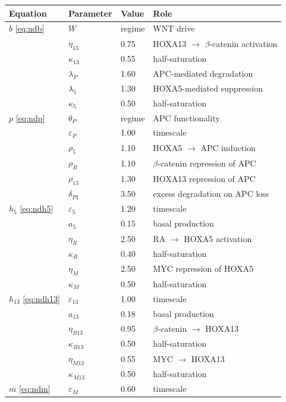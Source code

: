 \documentclass[11pt]{article}
\newcommand{\bcat}{$\beta$-\hspace{0pt}catenin}
\newcommand{\thP}{\theta_P}
\begin{document}
\begin{table}[H]
\centering
\small
\begin{tabular}{llll}
\toprule
\textbf{Equation} & \textbf{Parameter} & \textbf{Value} & \textbf{Role} \\
\midrule
$b$ \eqref{eq:ndb}
  & $W$          & regime & WNT drive \\
  & $\eta_{13}$  & 0.75 & HOXA13 $\to$ \bcat{} activation \\
  & $\kappa_{13}$& 0.55 & half-saturation \\
  & $\lambda_P$  & 1.60 & APC-mediated degradation \\
  & $\lambda_5$  & 1.30 & HOXA5-mediated suppression \\
  & $\kappa_5$   & 0.50 & half-saturation \\
\midrule
$p$ \eqref{eq:ndp}
  & $\thP$       & regime & APC functionality \\
  & $\varepsilon_P$ & 1.00 & timescale \\
  & $\rho_5$     & 1.10 & HOXA5 $\to$ APC induction \\
  & $\rho_B$     & 1.10 & \bcat{} repression of APC \\
  & $\rho_{13}$  & 1.30 & HOXA13 repression of APC \\
  & $\delta_{P1}$& 3.50 & excess degradation on APC loss \\
\midrule
$h_5$ \eqref{eq:ndh5}
  & $\varepsilon_5$ & 1.20 & timescale \\
  & $a_5$        & 0.15 & basal production \\
  & $\eta_R$     & 2.50 & RA $\to$ HOXA5 activation \\
  & $\kappa_R$   & 0.40 & half-saturation \\
  & $\eta_M$     & 2.50 & MYC repression of HOXA5 \\
  & $\kappa_M$   & 0.50 & half-saturation \\
\midrule
$h_{13}$ \eqref{eq:ndh13}
  & $\varepsilon_{13}$ & 1.00 & timescale \\
  & $a_{13}$     & 0.18 & basal production \\
  & $\eta_{B13}$ & 0.95 & \bcat{} $\to$ HOXA13 \\
  & $\kappa_{B13}$ & 0.50 & half-saturation \\
  & $\eta_{M13}$ & 0.55 & MYC $\to$ HOXA13 \\
  & $\kappa_{M13}$ & 0.50 & half-saturation \\
\midrule
$m$ \eqref{eq:ndm}
  & $\varepsilon_M$ & 0.60 & timescale \\

\end{tabular}
\end{table}
\end{document}
